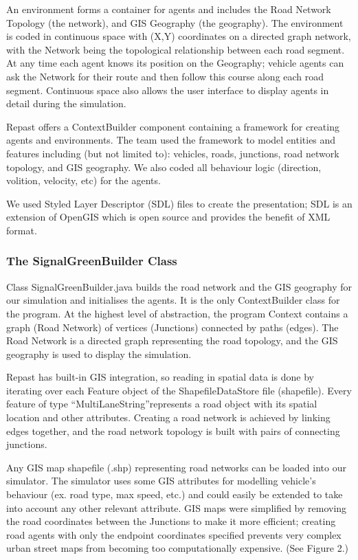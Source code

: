 \documentclass[11pt]{article}
\begin{document}
An environment forms a container for agents and includes the Road Network Topology (the network), and GIS Geography (the geography). The environment is coded in continuous space with (X,Y) coordinates on a directed graph network, with the Network being the topological relationship between each road segment. At any time each agent knows its position on the Geography; vehicle agents can ask the Network for their route and then follow this course along each road segment. Continuous space also allows the user interface to display agents in detail during the simulation.

Repast offers a ContextBuilder component containing a framework for creating agents and environments. The team used the framework to model entities and features including (but not limited to): vehicles, roads, junctions, road network topology, and GIS geography. We also coded all behaviour logic (direction, volition, velocity, etc) for the agents.

We used Styled Layer Descriptor (SDL) files to create the presentation; SDL is an extension of OpenGIS which is open source and provides the benefit of XML format.


\subsubsection{The SignalGreenBuilder Class}


Class SignalGreenBuilder.java builds the road network and the GIS geography for our simulation and initialises the agents. It is the only ContextBuilder class for the program. At the highest level of abstraction, the program Context contains a graph (Road Network) of vertices (Junctions) connected by paths (edges). The Road Network is a directed graph representing the road topology, and the GIS geography is used to display the simulation. 

Repast has built-in GIS integration, so reading in spatial data is done by iterating over each Feature object of the ShapefileDataStore file (shapefile). Every feature of type \textquotedblleft MultiLaneString\textquotedblright represents a road object with its spatial location and other attributes. Creating a road network is achieved by linking edges together, and the road network topology is built with pairs of connecting junctions.

Any GIS map shapefile (.shp) representing road networks can be loaded into our simulator. The simulator uses some GIS attributes for modelling vehicle\textquoteright s behaviour (ex. road type, max speed, etc.) and could easily be extended to take into account any other relevant attribute.
GIS maps were simplified by removing the road coordinates between the Junctions to make it more efficient; creating road agents with only the endpoint coordinates specified prevents very complex urban street maps from becoming too computationally expensive. (See Figure 2.)
\\
\end{document}
